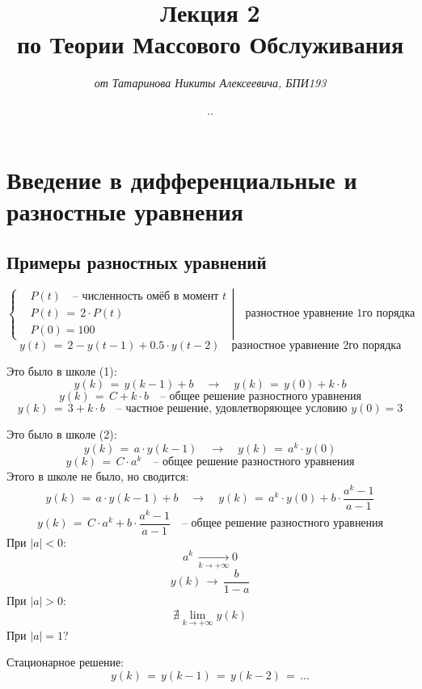 \documentclass{article}
\title{\textbf{Лекция 2\\по Теории Массового Обслуживания}}
\author{\textit{от Татаринова Никиты Алексеевича, БПИ193}}
\date{\the\year .\twodigits{\the\month}.\twodigits{\the\day}}
\begin{document}
\maketitle
\section*{Введение в дифференциальные и разностные уравнения}
\subsection*{Примеры разностных уравнений}
\begin{equation*}
\left\{
\begin{aligned}
& P(t) \quad \text{-- численность омёб в момент } t \\
& P(t) \, = \, 2 \! \cdot \! P(t) \\
& P(0) \! = \! 100
\end{aligned}
\right| \quad \text{разностное уравнение 1го порядка} 
\end{equation*}
\[ y(t) \, = \, 2 \! - \! y(t \! - \! 1) \! \! + \! 0.5 \! \cdot \! y(t \! - \! 2) \quad \text{разностное уравнение 2го порядка} \]\par
Это было в школе (1):
\[ y(k) \, = \, y(k \! - \! 1) \! + \! b \quad \rightarrow \quad y(k) \, = \, y(0) \! + \! k \! \cdot \! b \]
\[ y(k) \, = \, C \! + \! k \! \cdot \! b \quad \text{-- общее решение разностного уравнения} \]
\[ y(k) \, = \, 3 \! + \! k \! \cdot \! b \quad \text{-- частное решение, удовлетворяющее условию } y(0) \! = \! 3 \]\par
Это было в школе (2):
\[ y(k) \, = \, a \! \cdot \! y(k \! - \! 1) \quad \rightarrow \quad y(k) \, = \, a^k \! \cdot \! y(0) \]
\[ y(k) \, = \, C \! \cdot \! a^k \quad \text{-- общее решение разностного уравнения} \]
Этого в школе не было, но сводится:
\[ y(k) \, = \, a \! \cdot \! y(k \! - \! 1) \! + \! b \quad \rightarrow \quad y(k) \, = \, a^k \! \cdot \! y(0) + b \! \cdot \! \dfrac{a^k \! - \! 1}{a \! - \! 1} \]
\[ y(k) \, = \, C \! \cdot \! a^k \! + \! b \! \cdot \! \dfrac{a^k \! - \! 1}{a \! - \! 1} \quad \text{-- общее решение разностного уравнения} \]
При $ |a| \! < \! 0 $:
\[ a^k \, \underset{k \rightarrow +\infty}{\longrightarrow} 0 \]
\[ y(k) \, \longrightarrow \, \dfrac{b}{1 \! - \! a}  \]
При $ |a| \! > \! 0 $:
\[ \nexists \lim\limits_{k \rightarrow +\infty} y(k) \]
При $ |a| \! = \! 1 $?\par
Стационарное решение:
\[ y(k) \, = \, y(k \! - \! 1) \, = \, y(k \! - \! 2) \, = \, ... \]
\end{document}
